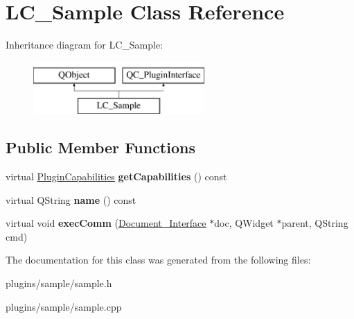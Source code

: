 \hypertarget{classLC__Sample}{\section{L\-C\-\_\-\-Sample Class Reference}
\label{classLC__Sample}
}
Inheritance diagram for L\-C\-\_\-\-Sample\-:\begin{figure}[H]
\begin{center}
\leavevmode
\includegraphics[height=2.000000cm]{classLC__Sample}
\end{center}
\end{figure}
\subsection*{Public Member Functions}
\begin{DoxyCompactItemize}
\item 
\hypertarget{classLC__Sample_a0cf88dc9697efd195cf4126879137899}{virtual \hyperlink{classPluginCapabilities}{Plugin\-Capabilities} {\bfseries get\-Capabilities} () const }\label{classLC__Sample_a0cf88dc9697efd195cf4126879137899}

\item 
\hypertarget{classLC__Sample_ac44c9cdd072a88d9241f0caa9d57e2a8}{virtual Q\-String {\bfseries name} () const }\label{classLC__Sample_ac44c9cdd072a88d9241f0caa9d57e2a8}

\item 
\hypertarget{classLC__Sample_ad99d9ee27033f0e292a847a0cf1d45a8}{virtual void {\bfseries exec\-Comm} (\hyperlink{classDocument__Interface}{Document\-\_\-\-Interface} $\ast$doc, Q\-Widget $\ast$parent, Q\-String cmd)}\label{classLC__Sample_ad99d9ee27033f0e292a847a0cf1d45a8}

\end{DoxyCompactItemize}


The documentation for this class was generated from the following files\-:\begin{DoxyCompactItemize}
\item 
plugins/sample/sample.\-h\item 
plugins/sample/sample.\-cpp\end{DoxyCompactItemize}
